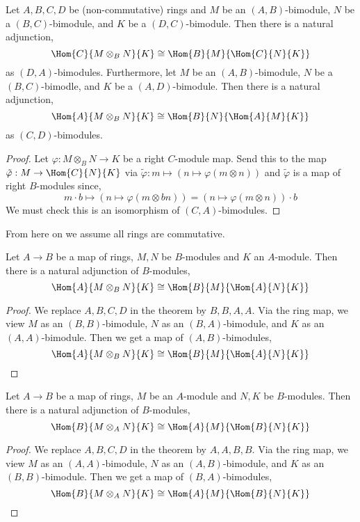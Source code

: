 \documentclass[12pt]{article}
\begin{document}
\begin{theorem}
Let $A, B, C, D$ be (non-commutative) rings and $M$ be an $(A, B)$-bimodule, $N$ be a $(B, C)$-bimodule, and $K$ be a $(D, C)$-bimodule. Then there is a natural adjunction,
\[ \Hom{C}{M \otimes_B N}{K} \cong \Hom{B}{M}{\Hom{C}{N}{K}} \]
as $(D, A)$-bimodules. Furthermore, let $M$ be an $(A, B)$-bimodule, $N$ be a $(B, C)$-bimodle, and $K$ be a $(A, D)$-bimodule. Then there is a natural adjunction,
\[ \Hom{A}{M \otimes_B N}{K} \cong \Hom{B}{N}{\Hom{A}{M}{K}} \]
as $(C, D)$-bimodules.
\end{theorem}

\begin{proof}
Let $\varphi : M \otimes_B N \to K$ be a right $C$-module map. Send this to the map $\tilde{\varphi} : M \to \Hom{C}{N}{K}$ via $\tilde{\varphi} : m \mapsto (n \mapsto \varphi(m \otimes n))$ and $\tilde{\varphi}$ is a map of right $B$-modules since,
\[ m \cdot b \mapsto (n \mapsto \varphi(m \otimes b n)) = (n \mapsto \varphi(m \otimes n)) \cdot b \]
We must check this is an isomorphism of $(C, A)$-bimodules. 
\end{proof}

\begin{rmk}
From here on we assume all rings are commutative. 
\end{rmk}

\begin{cor}
Let $A \to B$ be a map of rings, $M, N$ be $B$-modules and $K$ an $A$-module. Then there is a natural adjunction of $B$-modules,
\[ \Hom{A}{M \otimes_B N}{K} \cong \Hom{B}{M}{\Hom{A}{N}{K}} \]
\end{cor}

\begin{proof}
We replace $A,B,C,D$ in the theorem by $B,B,A,A$. Via the ring map, we view $M$ as an $(B,B)$-bimodule, $N$ as an $(B, A)$-bimodule, and $K$ as an $(A, A)$-bimodule. Then we get a map of $(A, B)$-bimodules,
\[ \Hom{A}{M \otimes_B N}{K} \cong \Hom{B}{M}{\Hom{A}{N}{K}} \]
\end{proof}

\begin{cor}
Let $A \to B$ be a map of rings, $M$ be an $A$-module and $N, K$ be $B$-modules. Then there is a natural adjunction of $B$-modules,
\[ \Hom{B}{M \otimes_A N}{K} \cong \Hom{A}{M}{\Hom{B}{N}{K}} \]
\end{cor}

\begin{proof}
We replace $A,B,C,D$ in the theorem by $A,A,B,B$. Via the ring map, we view $M$ as an $(A,A)$-bimodule, $N$ as an $(A, B)$-bimodule, and $K$ as an $(B, B)$-bimodule. Then we get a map of $(B, A)$-bimodules,
\[ \Hom{B}{M \otimes_A N}{K} \cong \Hom{A}{M}{\Hom{B}{N}{K}} \]
\end{proof}
\end{document}
